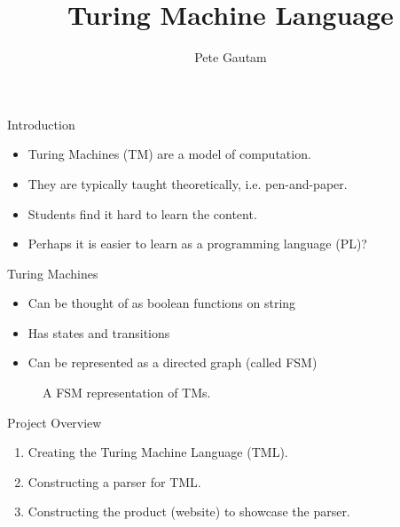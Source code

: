 \documentclass{beamer}
\title{Turing Machine Language}
\author{Pete Gautam}
\institute{University of Glasgow}
\begin{document}
    \frame{\titlepage}

    \begin{frame}{Introduction}
        \begin{itemize}
            \item Turing Machines (TM) are a model of computation.
            \item They are typically taught theoretically, i.e. pen-and-paper.
            \item Students find it hard to learn the content.
            \item Perhaps it is easier to learn as a programming language (PL)?
        \end{itemize}
    \end{frame}

    \begin{frame}{Turing Machines}
        \begin{itemize}
            \item Can be thought of as boolean functions on string
            \item Has states and transitions
            \item Can be represented as a directed graph (called FSM)
        \end{itemize}

        \begin{figure}[htb]
            \centering
            \caption{A FSM representation of TMs.}
        \end{figure}
    \end{frame}
    
    \begin{frame}{Project Overview}
        \begin{enumerate}
            \item Creating the Turing Machine Language (TML).
            \item Constructing a parser for TML.
            \item Constructing the product (website) to showcase the parser.
        \end{enumerate}
    \end{frame}
\end{document}
